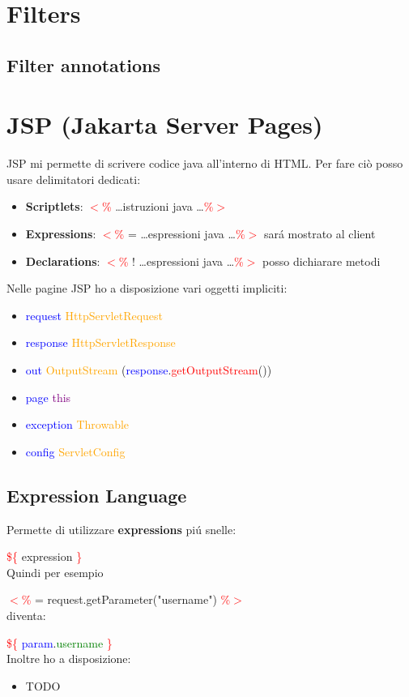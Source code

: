 \documentclass[11pt, letterpaper, titlepage]{article}
\newcommand{\openab}{\textcolor{red}{$<$\%} }
\newcommand{\closeab}{\textcolor{red}{\%$>$} }
\begin{document}
\section{Filters}

\subsection{Filter annotations}

\section{JSP (Jakarta Server Pages)}
JSP mi permette di scrivere codice java all'interno di HTML. Per fare ci\`o posso
usare delimitatori dedicati:
\begin{itemize}
    \item \textbf{Scriptlets}: \openab \dots istruzioni java \dots \closeab
    \item \textbf{Expressions}: \openab= \dots espressioni java \dots \closeab sar\'a mostrato al client
    \item \textbf{Declarations}: \openab! \dots espressioni java \dots \closeab posso dichiarare metodi
\end{itemize}
Nelle pagine JSP ho a disposizione vari oggetti impliciti:
\begin{itemize}
    \item \textcolor{blue}{request} \textcolor{orange}{HttpServletRequest}
    \item \textcolor{blue}{response} \textcolor{orange}{HttpServletResponse}
    \item \textcolor{blue}{out} \textcolor{orange}{OutputStream} (\textcolor{blue}{response}.\textcolor{red}{getOutputStream}())
    \item \textcolor{blue}{page} \textcolor{purple}{this}
    \item \textcolor{blue}{exception} \textcolor{orange}{Throwable}
    \item \textcolor{blue}{config} \textcolor{orange}{ServletConfig}
\end{itemize}

\subsection{Expression Language}
Permette di utilizzare \textbf{expressions} pi\'u snelle:\par
\textcolor{red}{\$\{} expression  \textcolor{red}{\}}\\
Quindi per esempio\par
\openab= request.getParameter("username") \closeab\\
diventa:\par
\textcolor{red}{\$\{} \textcolor{blue}{param}.\textcolor{green}{username} \textcolor{red}{\}}\\
Inoltre ho a disposizione:
\begin{itemize}
    \item TODO
\end{itemize}
\end{document}
